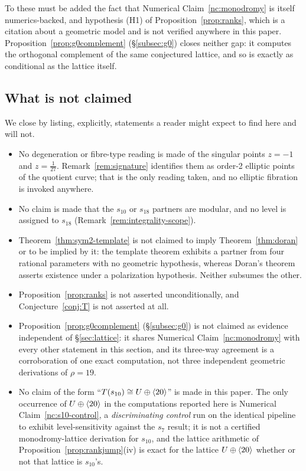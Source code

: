 To these must be added the fact that Numerical Claim~\ref{nc:monodromy} is
itself numerics-backed, and hypothesis (H1) of
Proposition~\ref{prop:ranks}, which is a citation about a geometric model and
is not verified anywhere in this paper. Proposition~\ref{prop:g0complement}
(\S\ref{subsec:g0}) closes neither gap: it computes the orthogonal complement
of the same conjectured lattice, and so is exactly as conditional as the
lattice itself.

\subsection{What is not claimed}

We close by listing, explicitly, statements a reader might expect to find here
and will not.

\begin{itemize}
\item No degeneration or fibre-type reading is made of the singular points
  $z=-1$ and $z=\tfrac1{27}$. Remark~\ref{rem:signature} identifies them as
  order-2 elliptic points of the quotient curve; that is the only reading
  taken, and no elliptic fibration is invoked anywhere.
\item No claim is made that the $s_{10}$ or $s_{18}$ partners are modular,
  and no level is assigned to $s_{18}$ (Remark~\ref{rem:integrality-scope}).
\item Theorem~\ref{thm:sym2-template} is not claimed to imply
  Theorem~\ref{thm:doran} or to be implied by it: the template theorem
  exhibits a partner from four rational parameters with no geometric
  hypothesis, whereas Doran's theorem asserts existence under a polarization
  hypothesis. Neither subsumes the other.
\item Proposition~\ref{prop:ranks} is not asserted unconditionally, and
  Conjecture~\ref{conj:T} is not asserted at all.
\item Proposition~\ref{prop:g0complement} (\S\ref{subsec:g0}) is not claimed
  as evidence independent of \S\ref{sec:lattice}: it shares Numerical
  Claim~\ref{nc:monodromy} with every other statement in this section, and its
  three-way agreement is a corroboration of one exact computation, not three
  independent geometric derivations of $\rho=19$.
\item No claim of the form ``$T(\text{$s_{10}$})\cong U\oplus\langle 20\rangle$'' is
  made in this paper. The only occurrence of $U\oplus\langle 20\rangle$ in the
  computations reported here is Numerical Claim~\ref{nc:s10-control}, a
  \emph{discriminating control} run on the identical pipeline to exhibit
  level-sensitivity against the $s_7$ result; it is not a certified
  monodromy-lattice derivation for $s_{10}$, and the lattice arithmetic of
  Proposition~\ref{prop:rankjump}(iv) is exact for the lattice $U\oplus\langle 20\rangle$
  whether or not that lattice is $s_{10}$'s.
\end{itemize}

